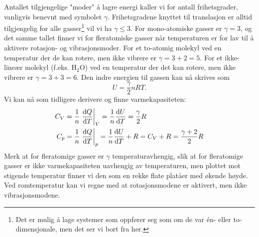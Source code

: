 Antallet tilgjengelige "moder" å lagre energi kaller vi for antall frihetsgrader, vanligvis benevnt med symbolet $\gamma$. Frihetsgradene knyttet til translasjon er alltid tilgjengelig for alle gasser\footnote{Det er mulig å lage systemer som oppfører seg som om de var \'en- eller to-dimensjonale, men det ser vi bort fra her.} vil vi ha $\gamma\leq3$. For mono-atomiske gasser er $\gamma = 3$, og det samme tallet finner vi for fleratomiske gasser når temperaturen er for lav til å aktivere rotasjon- og vibrasjonsmoder. For et to-atomig molekyl ved en temperatur der de kan rotere, men ikke vibrere er $\gamma = 3+ 2 = 5$. For et ikke-lineær molekyl (f.eks. H$_2$O) ved en temperatur der det kan rotere, men ikke vibrere er $\gamma = 3+3 = 6$. Den indre energien til gassen kan nå skrives som 
\begin{displaymath}
	U = \frac{\gamma}{2}nRT.
\end{displaymath}
Vi kan nå som tidligere derivere og finne varmekapasiteten:
\begin{displaymath}
\begin{aligned}
	C_V &= \frac{1}{n}\left.\frac{\text{d} Q}{\text{d} T}\right|_V = \frac{1}{n} \frac{\text{d} U}{\text{d} T} = \frac{\gamma}{2}R \\
	C_p &= \frac{1}{n}\left.\frac{\text{d} Q}{\text{d} T}\right|_p = \frac{1}{n} \frac{\text{d} U}{\text{d} T} + R = C_V + R = \frac{\gamma+2}{2}R
\end{aligned}
\end{displaymath}
Merk at for fleratomige gasser er $\gamma$ temperaturavhengig, slik at for fleratomige gasser er ikke varmekapasiteten uavhengig av temperaturen, men plottet mot stigende temperatur finner vi den som en rekke flate platåer med økende høyde. Ved romtemperatur kan vi regne med at rotasjonsmodene er aktivert, men ikke vibrasjonsmodene. 

